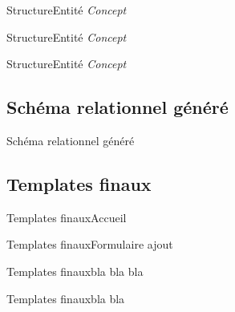 \begin{frame}{Structure}{Entité \emph{Concept}}

\end{frame}

\begin{frame}{Structure}{Entité \emph{Concept}}

\end{frame}

\begin{frame}{Structure}{Entité \emph{Concept}}

\end{frame}

\subsection{Schéma relationnel généré}

\begin{frame}{Schéma relationnel généré}
\end{frame}

\subsection{Templates finaux}
\begin{frame}{Templates finaux}{Accueil}
\end{frame}
\begin{frame}{Templates finaux}{Formulaire ajout}
\end{frame}
\begin{frame}{Templates finaux}{bla bla bla}
\end{frame}
\begin{frame}{Templates finaux}{bla bla}
\end{frame}